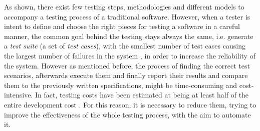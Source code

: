 As shown, there exist few testing steps, methodologies and different models to accompany a testing process of a traditional software. However, when a tester is intent to define and choose the right pieces for testing a software in a careful manner, the common goal behind the testing stays always the same, i.e. generate a \textit{test suite} (a set of \textit{test cases}), with the smallest number of test cases causing the largest number of failures in the system \cite{grano}, in order to increase the reliability of the system. 
However as mentioned before, the process of finding the correct test scenarios, afterwards execute them and finally report their results and compare them to the previously written specifications, might be time-consuming and cost-intensive. In fact, testing costs have been estimated at being at least half of the entire development cost \cite{Beizer:1990:STT:79060}. For this reason, it is necessary to reduce them, trying to improve the effectiveness of the whole testing process, with the aim to automate it. 

